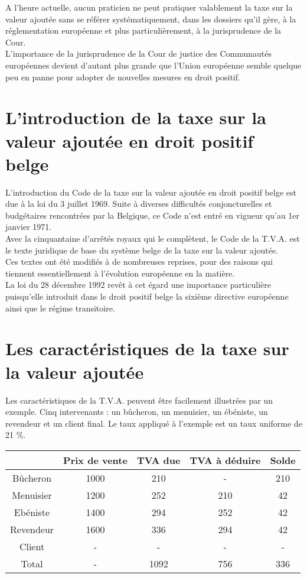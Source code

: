 \documentclass{book}
\begin{document}
A l’heure actuelle, aucun praticien ne peut pratiquer valablement la taxe sur la valeur ajoutée
sans se référer systématiquement, dans les dossiers qu’il gère, à la réglementation européenne
et plus particulièrement, à la jurisprudence de la Cour.\\

L’importance de la jurisprudence de la Cour de justice des Communautés européennes
devient d’autant plus grande que l’Union européenne semble quelque peu en panne pour
adopter de nouvelles mesures en droit positif.\\

\chapter{L'introduction de la taxe sur la valeur ajoutée en droit positif belge}

L'introduction du Code de la taxe sur la valeur ajoutée en droit positif belge est due à la loi du
3 juillet 1969. Suite à diverses difficultés conjoncturelles et budgétaires rencontrées par la
Belgique, ce Code n'est entré en vigueur qu'au 1er janvier 1971.\\

Avec la cinquantaine d'arrêtés royaux qui le complètent, le Code de la T.V.A. est le texte
juridique de base du système belge de la taxe sur la valeur ajoutée.\\

Ces textes ont été modifiés à de nombreuses reprises, pour des raisons qui tiennent
essentiellement à l'évolution européenne en la matière.\\

La loi du 28 décembre 1992 revêt à cet égard une importance particulière puisqu'elle introduit
dans le droit positif belge la sixième directive européenne ainsi que le régime transitoire.

\chapter{Les caractéristiques de la taxe sur la valeur ajoutée}

Les caractéristiques de la T.V.A. peuvent être facilement illustrées par un exemple.
Cinq intervenants : un bûcheron, un menuisier, un ébéniste, un revendeur et un client final. Le
taux appliqué à l'exemple est un taux uniforme de 21 \%.\\

\begin{tabular}{|c|c|c|c|c|}
  \hline
   & Prix de vente & TVA due & TVA à déduire & Solde \\
  \hline
  	Bûcheron & 1000 & 210 & - & 210\\
    Menuisier & 1200 & 252 & 210 & 42\\
    Ebéniste & 1400 & 294 & 252 & 42\\
    Revendeur & 1600 & 336 & 294 & 42\\
    Client & - & - & - & -\\
     \hline

Total & - & 1092 & 756 & 336\\

  \hline
\end{tabular}
\end{document}
